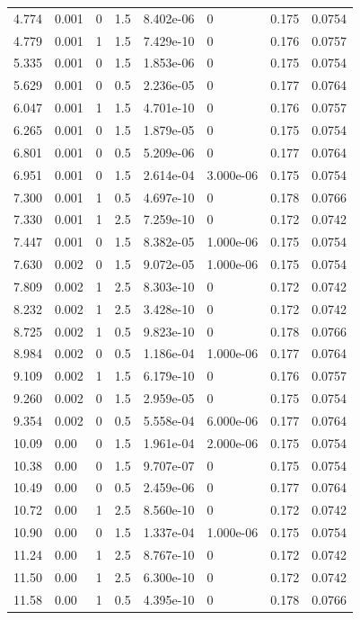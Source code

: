 \documentclass[preview]{standalone}
\begin{document}
{{\begin{tabular}{L{1.2cm}C{1.2cm} C{0.3cm}C{0.5cm} C{1.4cm}C{1.4cm} C{1.4cm}C{1.4cm}}
  4.774  &  0.001  & 0     & 1.5 &  8.402e-06  & 0  & 0.175 &  0.0754   \\ 
  4.779  &  0.001  & 1     & 1.5 &  7.429e-10  & 0  & 0.176 &  0.0757   \\ 
  5.335  &  0.001  & 0     & 1.5 &  1.853e-06  & 0  & 0.175 &  0.0754   \\ 
  5.629  &  0.001  & 0     & 0.5 &  2.236e-05  & 0  & 0.177 &  0.0764   \\ 
  6.047  &  0.001  & 1     & 1.5 &  4.701e-10  & 0  & 0.176 &  0.0757   \\ 
  6.265  &  0.001  & 0     & 1.5 &  1.879e-05  & 0  & 0.175 &  0.0754   \\ 
  6.801  &  0.001  & 0     & 0.5 &  5.209e-06  & 0  & 0.177 &  0.0764   \\ 
  6.951  &  0.001  & 0     & 1.5 &  2.614e-04  & 3.000e-06  & 0.175 &  0.0754   \\ 
  7.300  &  0.001  & 1     & 0.5 &  4.697e-10  & 0  & 0.178 &  0.0766   \\ 
  7.330  &  0.001  & 1     & 2.5 &  7.259e-10  & 0  & 0.172 &  0.0742   \\ 
  7.447  &  0.001  & 0     & 1.5 &  8.382e-05  & 1.000e-06  & 0.175 &  0.0754   \\ 
  7.630  &  0.002  & 0     & 1.5 &  9.072e-05  & 1.000e-06  & 0.175 &  0.0754   \\ 
  7.809  &  0.002  & 1     & 2.5 &  8.303e-10  & 0  & 0.172 &  0.0742   \\ 
  8.232  &  0.002  & 1     & 2.5 &  3.428e-10  & 0  & 0.172 &  0.0742   \\ 
  8.725  &  0.002  & 1     & 0.5 &  9.823e-10  & 0  & 0.178 &  0.0766   \\ 
  8.984  &  0.002  & 0     & 0.5 &  1.186e-04  & 1.000e-06  & 0.177 &  0.0764   \\ 
  9.109  &  0.002  & 1     & 1.5 &  6.179e-10  & 0  & 0.176 &  0.0757   \\ 
  9.260  &  0.002  & 0     & 1.5 &  2.959e-05  & 0  & 0.175 &  0.0754   \\ 
  9.354  &  0.002  & 0     & 0.5 &  5.558e-04  & 6.000e-06  & 0.177 &  0.0764   \\ 
  10.09  &  0.00  & 0     & 1.5 &  1.961e-04  & 2.000e-06  & 0.175 &  0.0754   \\ 
  10.38  &  0.00  & 0     & 1.5 &  9.707e-07  & 0  & 0.175 &  0.0754   \\ 
  10.49  &  0.00  & 0     & 0.5 &  2.459e-06  & 0  & 0.177 &  0.0764   \\ 
  10.72  &  0.00  & 1     & 2.5 &  8.560e-10  & 0  & 0.172 &  0.0742   \\ 
  10.90  &  0.00  & 0     & 1.5 &  1.337e-04  & 1.000e-06  & 0.175 &  0.0754   \\ 
  11.24  &  0.00  & 1     & 2.5 &  8.767e-10  & 0  & 0.172 &  0.0742   \\ 
  11.50  &  0.00  & 1     & 2.5 &  6.300e-10  & 0  & 0.172 &  0.0742   \\ 
  11.58  &  0.00  & 1     & 0.5 &  4.395e-10  & 0  & 0.178 &  0.0766   \\ 
\hline 
\end{tabular} 

}}
\end{document}
